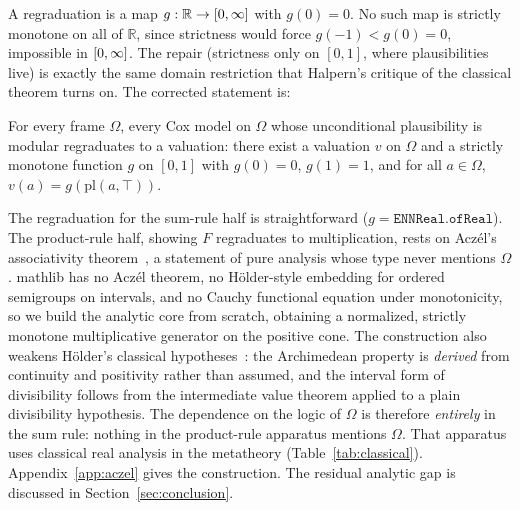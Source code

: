 A regraduation is a map $g : \mathbb{R} \to [0,\infty]$ with
$g(0) = 0$.  No such map is strictly monotone on all of $\mathbb{R}$,
since strictness would force $g(-1) < g(0) = 0$, impossible in
$[0,\infty]$.
The repair (strictness only on $[0,1]$, where plausibilities live)
is exactly the same domain restriction that Halpern's critique of
the classical theorem turns on.  The corrected statement is:

\begin{theorem}
\label{thm:cox}
For every frame $\Omega$, every Cox model on $\Omega$ whose
unconditional plausibility is modular
regraduates to a valuation: there exist a valuation $v$ on $\Omega$ and a strictly monotone function $g$ on $[0,1]$ with $g(0)=0$,
$g(1)=1$, and for all
$a \in \Omega$, $v(a) = g(\mathrm{pl}(a, \top))$.
\end{theorem}

The regraduation for the sum-rule half is straightforward
($g = \texttt{ENNReal.ofReal}$).  The product-rule half, showing $F$
regraduates to multiplication, rests on Acz\'el's associativity
theorem~\cite{aczel1966}, a statement of pure analysis whose type
never mentions $\Omega$.  \textsf{mathlib} has no Acz\'el theorem, no
H\"older-style embedding for ordered semigroups on intervals, and no
Cauchy functional equation under monotonicity, so we build the
analytic core from scratch, obtaining a normalized, strictly monotone
multiplicative generator on the positive
cone.  The construction also weakens
H\"older's classical hypotheses~\cite{hoelder1901}: the Archimedean
property is \emph{derived} from continuity and positivity rather than
assumed, and the interval form of divisibility follows from the
intermediate value theorem applied to a
plain divisibility hypothesis.  The
dependence on the logic of $\Omega$ is therefore \emph{entirely} in the
sum rule: nothing in the product-rule apparatus mentions $\Omega$. That
apparatus uses classical real analysis in the metatheory
(Table~\ref{tab:classical}).
Appendix~\ref{app:aczel} gives the construction.  The residual
analytic gap is discussed in
Section~\ref{sec:conclusion}.
